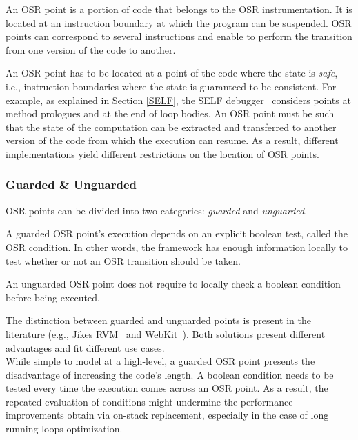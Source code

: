\begin{definition}\label{OSRPointDefinition}
An OSR point is a portion of code that belongs to the OSR instrumentation.
It is located at an instruction boundary at which the program can be suspended.
OSR points can correspond to several instructions and enable to perform the transition from one version of the code to another.
\end{definition}

An OSR point has to be located at a point of the code where the state is \textit{safe}, i.e., instruction boundaries where the state is guaranteed to be consistent.
For example, as explained in Section \ref{SELF}, the SELF debugger~\cite{holzle1992debugging} considers points at method prologues and at the end of loop bodies.
An OSR point must be such that the state of the computation can be extracted and transferred to another version of the code from which the execution can resume.
As a result, different implementations yield different restrictions on the location of OSR points.\\

\subsubsection{Guarded \& Unguarded}

OSR points can be divided into two categories: \textit{guarded} and \textit{unguarded}.
\begin{definition}
A guarded OSR point's execution depends on an explicit boolean test, called the OSR condition.
In other words, the framework has enough information locally to test whether or not an OSR transition should be taken.
\end{definition}
\begin{definition}
An unguarded OSR point does not require to locally check a boolean condition before being executed. 
\end{definition}
The distinction between guarded and unguarded points is present in the literature (e.g., Jikes RVM~\cite{fink2003design, soman2006efficient} and WebKit~\cite{WebKitURL}).
Both solutions present different advantages and fit different use cases.\\

While simple to model at a high-level, a guarded OSR point presents the disadvantage of increasing the code's length. 
A boolean condition needs to be tested every time the execution comes across an OSR point.
As a result, the repeated evaluation of conditions might undermine the performance improvements obtain via on-stack replacement, especially in the case of long running loops optimization.\\

